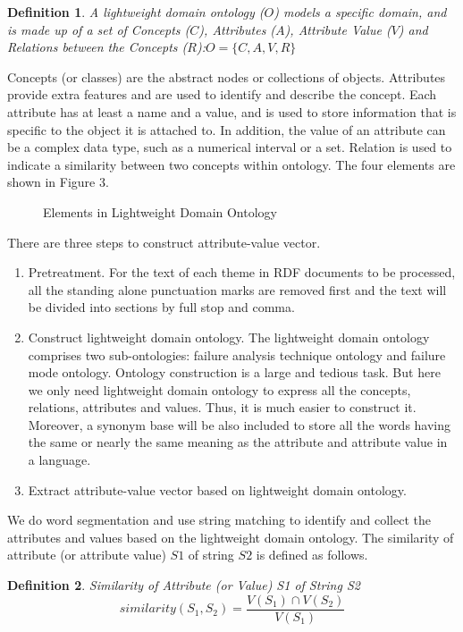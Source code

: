 \documentclass{elsarticle}
\newtheorem{definition}{Definition}
\begin{document}
\begin{definition}
  A lightweight domain ontology ($O$) models a specific domain, and is
  made up of a set of Concepts ($C$), Attributes ($A$), Attribute
  Value ($V$) and Relations between the Concepts ($R$):$O = \{C,A,V,R\}$


\end{definition}

Concepts (or classes) are the abstract nodes or collections of objects. Attributes provide extra features and are used to identify and describe the concept. Each attribute has at least a name and a value, and is used to store information that is specific to the object it is attached to. In addition, the value of an attribute can be a complex data type, such as a numerical interval or a set. Relation is used to indicate a similarity between two concepts within ontology. The four elements are shown in Figure 3.
\begin{figure}[htb]
  \centering
  \caption{Elements in Lightweight Domain Ontology}
\end{figure}
There are three steps to construct attribute-value vector.
\begin{enumerate}
\item Pretreatment. For the text of each theme in RDF documents to be processed, all the standing alone punctuation marks are removed first and the text will be divided into sections by full stop and comma.
\item  Construct lightweight domain ontology. The lightweight domain ontology comprises two sub-ontologies: failure analysis technique ontology and failure mode ontology. Ontology construction is a large and tedious task. But here we only need lightweight domain ontology to express all the concepts, relations, attributes and values. Thus, it is much easier to construct it. Moreover, a synonym base will be also included to store all the words having the same or nearly the same meaning as the attribute and attribute value in a language. 
\item Extract attribute-value vector based on lightweight domain ontology.

\end{enumerate}

We do word segmentation and use string matching to identify and collect the attributes and values based on the lightweight domain ontology. The similarity of attribute (or attribute value) $S1$ of string $S2$ is defined as follows.
\begin{definition}
  Similarity of Attribute (or Value) S1 of String
  S2 \[similarity(S_1,S_2) = \frac{V(S_1) \cap V(S_2)}{V(S_1)} \]

\end{definition}
\end{document}

